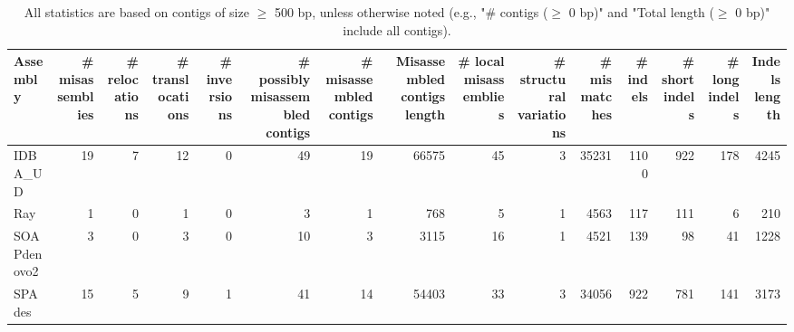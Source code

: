 \documentclass[12pt,a4paper]{article}
\begin{document}
\begin{table}[ht]
\begin{center}
\caption{All statistics are based on contigs of size $\geq$ 500 bp, unless otherwise noted (e.g., "\# contigs ($\geq$ 0 bp)" and "Total length ($\geq$ 0 bp)" include all contigs).}
\begin{tabular}{|l*{14}{|r}|}
\hline
Assembly & \# misassemblies &     \# relocations &     \# translocations &     \# inversions & \# possibly misassembled contigs & \# misassembled contigs & Misassembled contigs length & \# local misassemblies & \# structural variations & \# mismatches & \# indels &     \# short indels &     \# long indels & Indels length \\ \hline
IDBA\_UD & 19 & 7 & 12 & 0 & 49 & 19 & 66575 & 45 & 3 & 35231 & 1100 & 922 & 178 & 4245 \\ \hline
Ray & 1 & 0 & 1 & 0 & 3 & 1 & 768 & 5 & 1 & 4563 & 117 & 111 & 6 & 210 \\ \hline
SOAPdenovo2 & 3 & 0 & 3 & 0 & 10 & 3 & 3115 & 16 & 1 & 4521 & 139 & 98 & 41 & 1228 \\ \hline
SPAdes & 15 & 5 & 9 & 1 & 41 & 14 & 54403 & 33 & 3 & 34056 & 922 & 781 & 141 & 3173 \\ \hline
\end{tabular}
\end{center}
\end{table}
\end{document}
